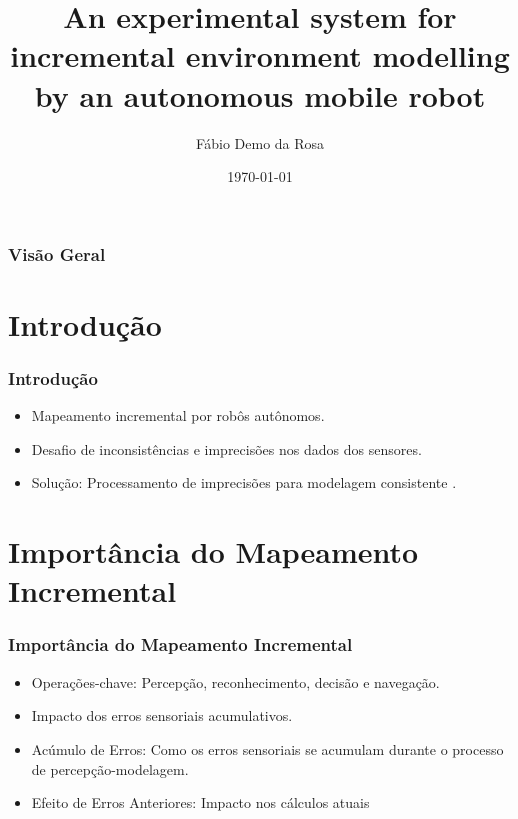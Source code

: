 \documentclass[xcolor=dvipsnames, aspectratio=169]{beamer}
\title[An experimental system for incremental environment modelling by an autonomous mobile robot]{An experimental system for incremental environment modelling by an autonomous mobile robot} %
\author[FDR]{Fábio Demo da Rosa} %
\institute[UFSM] %
{
Universidade Federal de Santa Maria \\ %
Pós-Graduação em Ciência da Computação \\
Disciplina de Robótica Móvel\\
\medskip
\textit{faberdemo@gmail.com} %
}
\date{\today} %
\begin{document}
\begin{frame}
\titlepage %
\end{frame}

\begin{frame}
\frametitle{Visão Geral} %
\tableofcontents %
\end{frame}


\section{Introdução}
\begin{frame}[fragile]
  \frametitle{Introdução}
  \begin{itemize}
    \item Mapeamento incremental por robôs autônomos.
    \item Desafio de inconsistências e imprecisões nos dados dos sensores.
    \item Solução: Processamento de imprecisões para modelagem consistente \cite{moutarlier2006experimental}.
  \end{itemize}
\end{frame}

\section{Importância do Mapeamento Incremental}
\begin{frame}
  \frametitle{Importância do Mapeamento Incremental}
  \begin{itemize}
      \item Operações-chave: Percepção, reconhecimento, decisão e navegação.
      \item Impacto dos erros sensoriais acumulativos.
      \item Acúmulo de Erros: Como os erros sensoriais se acumulam durante o processo de percepção-modelagem.
      \item Efeito de Erros Anteriores: Impacto nos cálculos atuais
  \end{itemize}
\end{frame}
\end{document}
